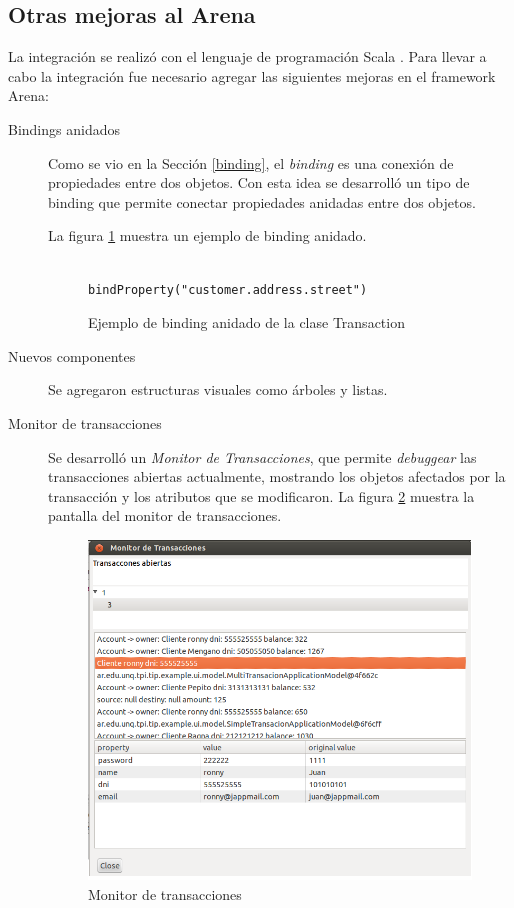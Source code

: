 \subsection{Otras mejoras al Arena}
	La integración se realizó con el lenguaje de programación Scala
	\cite{OderskySpoonVenners08}. Para llevar a cabo la integración fue necesario
	agregar las siguientes mejoras en el framework Arena:
	\begin{description}

	  \item[Bindings anidados] Como se vio en la Sección \ref{binding},
		  el \emph{binding} es una conexión de propiedades entre dos objetos. Con
		  esta idea se desarrolló un tipo de binding que permite conectar propiedades
		  anidadas entre dos objetos. 
		  
		  La figura \ref{bindAnidado} muestra un ejemplo de binding anidado.

		\begin{figure}[hbt]
			\centering
					\begin{lstlisting}
						bindProperty("customer.address.street") 
					\end{lstlisting}
			\caption{Ejemplo de binding anidado de la clase Transaction}
			\label{bindAnidado}
		\end{figure}	

	  \item[Nuevos componentes] Se agregaron estructuras visuales como árboles y listas.

  	  \item[Monitor de transacciones]
		 Se desarrolló un \emph{Monitor de Transacciones}, que permite
		 \emph{debuggear} las transacciones abiertas actualmente, mostrando
		 los objetos afectados por la transacción y los atributos que se
		 modificaron.
		La figura \ref{monitor} muestra la pantalla del monitor de transacciones.
		
		\begin{figure}[hbt]
			\centering
			\includegraphics[scale=0.5]{img/monitorTransacciones.png}
			\caption{Monitor de transacciones}
			\label{monitor}
		\end{figure}	
	\end{description}
